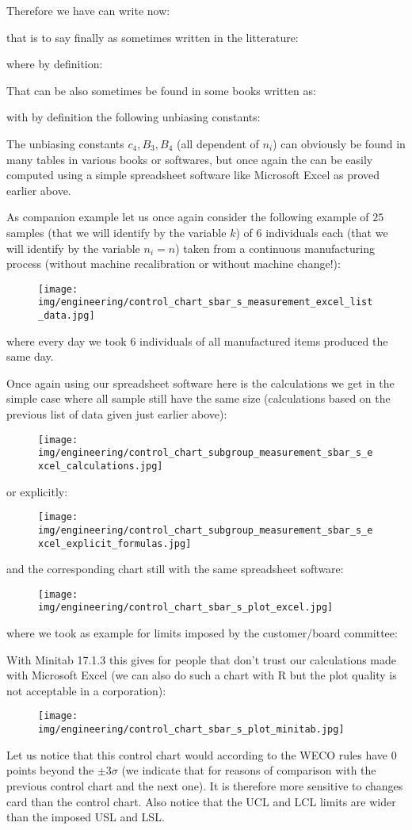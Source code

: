 	Therefore we have can write now:
	
	that is to say finally as sometimes written in the litterature:
	
	where by definition:
	
	That can be also sometimes be found in some books written as:
		
	with by definition the following unbiasing constants:
	
	The unbiasing constants $c_4,B_3,B_4$ (all dependent of $n_i$) can obviously be found in many tables in various books or softwares, but once again the can be easily computed using a simple spreadsheet software like Microsoft Excel as proved earlier above.

	As companion example let us once again consider the following example of $25$ samples (that we will identify by the variable $k$) of $6$ individuals each (that we will identify by the variable $n_i=n$) taken from a continuous manufacturing process (without machine recalibration or without machine change!):
 	\begin{figure}[H]
		\centering
		\texttt{[image: img/engineering/control\_chart\_sbar\_s\_measurement\_excel\_list\_data.jpg]}
	\end{figure}
	where every day we took $6$ individuals of all manufactured items produced the same day.
	
	Once again using our spreadsheet software here is the calculations we get in the simple case where all sample still have the same size (calculations based on the previous list of data given just earlier above):
	\begin{figure}[H]
		\centering
		\texttt{[image: img/engineering/control\_chart\_subgroup\_measurement\_sbar\_s\_excel\_calculations.jpg]}
	\end{figure}
	or explicitly:
	\begin{figure}[H]
		\centering
		\texttt{[image: img/engineering/control\_chart\_subgroup\_measurement\_sbar\_s\_excel\_explicit\_formulas.jpg]}
	\end{figure}
	and the corresponding chart still with the same spreadsheet software:
	\begin{figure}[H]
		\centering
		\texttt{[image: img/engineering/control\_chart\_sbar\_s\_plot\_excel.jpg]}
	\end{figure}
	where we took as example for limits imposed by the customer/board committee:
	
	With Minitab 17.1.3 this gives for people that don't trust our calculations made with Microsoft Excel (we can also do such a chart with R but the plot quality is not acceptable in a corporation):
	\begin{figure}[H]
		\centering
		\texttt{[image: img/engineering/control\_chart\_sbar\_s\_plot\_minitab.jpg]}
	\end{figure}
	Let us notice that this control chart would according to the WECO rules have $0$ points beyond the $\pm 3\sigma$ (we indicate that for reasons of comparison with the previous control chart and the next one). It is therefore more sensitive to changes card than the control chart. Also notice that the UCL and LCL limits are wider than the imposed USL and LSL.
	

